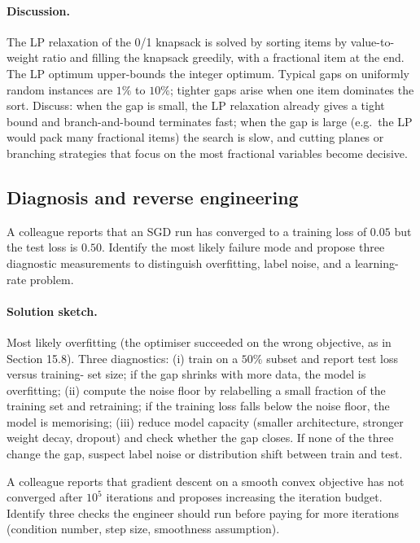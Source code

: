 \paragraph{Discussion.}
The LP relaxation of the 0/1 knapsack is solved by sorting items
by value-to-weight ratio and filling the knapsack greedily, with a
fractional item at the end. The LP optimum upper-bounds the
integer optimum. Typical gaps on uniformly random instances are
$1\%$ to $10\%$; tighter gaps arise when one item dominates the
sort. Discuss: when the gap is small, the LP relaxation already
gives a tight bound and branch-and-bound terminates fast; when
the gap is large (e.g.\ the LP would pack many fractional items)
the search is slow, and cutting planes or branching strategies
that focus on the most fractional variables become decisive.

\subsection*{Diagnosis and reverse engineering}

\begin{exercise}
A colleague reports that an SGD run has converged to a training
loss of $0.05$ but the test loss is $0.50$. Identify the most
likely failure mode and propose three diagnostic measurements to
distinguish overfitting, label noise, and a learning-rate
problem.
\end{exercise}

\paragraph{Solution sketch.}
Most likely overfitting (the optimiser succeeded on the wrong
objective, as in Section 15.8). Three diagnostics:
(i) train on a $50\%$ subset and report test loss versus training-
set size; if the gap shrinks with more data, the model is
overfitting; (ii) compute the noise floor by relabelling a
small fraction of the training set and retraining; if the
training loss falls below the noise floor, the model is
memorising; (iii) reduce model capacity (smaller architecture,
stronger weight decay, dropout) and check whether the gap closes.
If none of the three change the gap, suspect label noise or
distribution shift between train and test.

\begin{exercise}
A colleague reports that gradient descent on a smooth convex
objective has not converged after $10^{5}$ iterations and
proposes increasing the iteration budget. Identify three checks
the engineer should run before paying for more iterations
(condition number, step size, smoothness assumption).
\end{exercise}

